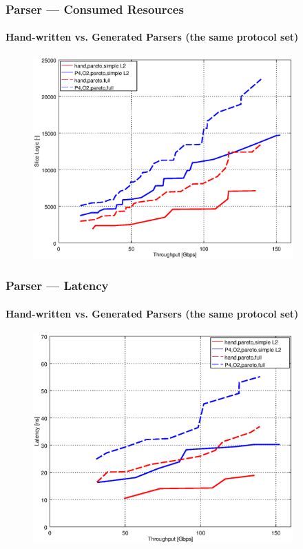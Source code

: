 \begin{frame}
    \frametitle{Parser --- Consumed Resources}
    \framesubtitle{Hand-written vs. Generated Parsers (the same protocol set)}
    
    \begin{figure}[t]
        \centering
        \includegraphics[width=0.89\textwidth]{pic/graph/hfe/1_thrslice_logic_pareto}
    \end{figure}
\end{frame}

\begin{frame}
    \frametitle{Parser --- Latency}
    \framesubtitle{Hand-written vs. Generated Parsers (the same protocol set)}
    
    \begin{figure}[t]
        \centering
        \includegraphics[width=0.89\textwidth]{pic/graph/hfe/2_thrlat_pareto}
    \end{figure}
\end{frame}

